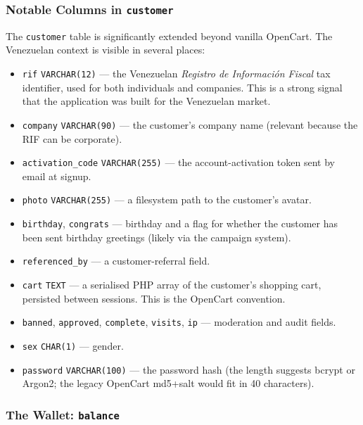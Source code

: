 \documentclass[11pt,a4paper]{article}
\begin{document}
\subsubsection{Notable Columns in \texttt{customer}}

The \texttt{customer} table is significantly extended beyond vanilla
OpenCart. The Venezuelan context is visible in several places:

\begin{itemize}[leftmargin=1.6em,itemsep=2pt]
  \item \texttt{rif} \texttt{VARCHAR(12)} --- the Venezuelan
        \emph{Registro de Informaci\'on Fiscal} tax identifier,
        used for both individuals and companies. This is a
        strong signal that the application was built for the
        Venezuelan market.
  \item \texttt{company} \texttt{VARCHAR(90)} --- the customer's
        company name (relevant because the RIF can be corporate).
  \item \texttt{activation\_code} \texttt{VARCHAR(255)} --- the
        account-activation token sent by email at signup.
  \item \texttt{photo} \texttt{VARCHAR(255)} --- a filesystem
        path to the customer's avatar.
  \item \texttt{birthday}, \texttt{congrats} --- birthday and a
        flag for whether the customer has been sent birthday
        greetings (likely via the campaign system).
  \item \texttt{referenced\_by} --- a customer-referral field.
  \item \texttt{cart} \texttt{TEXT} --- a serialised PHP array
        of the customer's shopping cart, persisted between
        sessions. This is the OpenCart convention.
  \item \texttt{banned}, \texttt{approved}, \texttt{complete},
        \texttt{visits}, \texttt{ip} --- moderation and audit
        fields.
  \item \texttt{sex} \texttt{CHAR(1)} --- gender.
  \item \texttt{password} \texttt{VARCHAR(100)} --- the password
        hash (the length suggests bcrypt or Argon2; the legacy
        OpenCart md5+salt would fit in 40 characters).
\end{itemize}

\subsubsection{The Wallet: \texttt{balance}}
\end{document}
